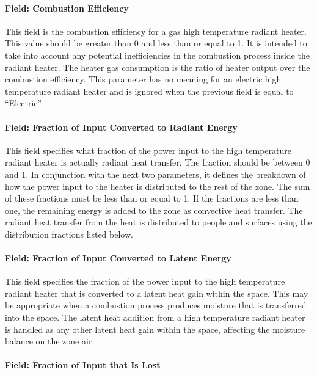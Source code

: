 \paragraph{Field: Combustion Efficiency}\label{field-combustion-efficiency}

This field is the combustion efficiency for a gas high temperature radiant heater. This value should be greater than 0 and less than or equal to 1. It is intended to take into account any potential inefficiencies in the combustion process inside the radiant heater. The heater gas consumption is the ratio of heater output over the combustion efficiency. This parameter has no meaning for an electric high temperature radiant heater and is ignored when the previous field is equal to ``Electric''.

\paragraph{Field: Fraction of Input Converted to Radiant Energy}\label{field-fraction-of-input-converted-to-radiant-energy}

This field specifies what fraction of the power input to the high temperature radiant heater is actually radiant heat transfer. The fraction should be between 0 and 1. In conjunction with the next two parameters, it defines the breakdown of how the power input to the heater is distributed to the rest of the zone. The sum of these fractions must be less than or equal to 1. If the fractions are less than one, the remaining energy is added to the zone as convective heat transfer. The radiant heat transfer from the heat is distributed to people and surfaces using the distribution fractions listed below.

\paragraph{Field: Fraction of Input Converted to Latent Energy}\label{field-fraction-of-input-converted-to-latent-energy}

This field specifies the fraction of the power input to the high temperature radiant heater that is converted to a latent heat gain within the space. This may be appropriate when a combustion process produces moisture that is transferred into the space. The latent heat addition from a high temperature radiant heater is handled as any other latent heat gain within the space, affecting the moisture balance on the zone air.

\paragraph{Field: Fraction of Input that Is Lost}\label{field-fraction-of-input-that-is-lost}

